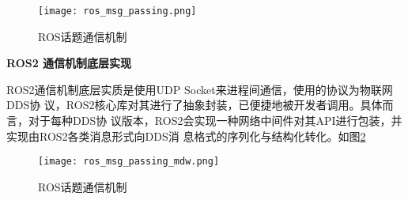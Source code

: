 \begin{figure}[H]
    \centering
    \texttt{[image: ros\_msg\_passing.png]}
    \caption{ROS话题通信机制}
    \label{pic:rmp}
\end{figure}

\textbf{ROS2 通信机制底层实现}

ROS2通信机制底层实质是使用UDP Socket来进程间通信，使用的协议为物联网DDS协
议，ROS2核心库对其进行了抽象封装，已便捷地被开发者调用。具体而言，对于每种DDS协
议版本，ROS2会实现一种网络中间件对其API进行包装，并实现由ROS2各类消息形式向DDS消
息格式的序列化与结构化转化。如图\ref{pic:rmpm}

\begin{figure}[H]
    \centering
    \texttt{[image: ros\_msg\_passing\_mdw.png]}
    \caption{ROS话题通信机制}
    \label{pic:rmpm}
\end{figure}